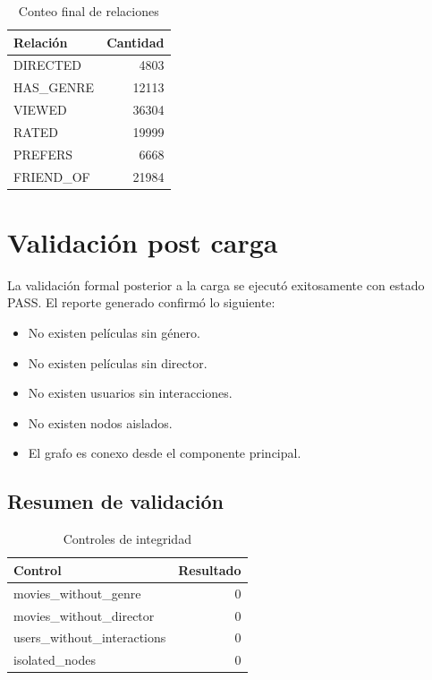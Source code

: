 \documentclass[12pt,a4paper]{article}
\begin{document}
\begin{table}[H]
\centering
\begin{tabular}{lr}
\toprule
\textbf{Relación} & \textbf{Cantidad} \\
\midrule
DIRECTED & 4803 \\
HAS\_GENRE & 12113 \\
VIEWED & 36304 \\
RATED & 19999 \\
PREFERS & 6668 \\
FRIEND\_OF & 21984 \\
\bottomrule
\end{tabular}
\caption{Conteo final de relaciones}
\end{table}

\section{Validación post carga}

La validación formal posterior a la carga se ejecutó exitosamente con estado PASS. El reporte generado confirmó lo siguiente:

\begin{itemize}
    \item No existen películas sin género.
    \item No existen películas sin director.
    \item No existen usuarios sin interacciones.
    \item No existen nodos aislados.
    \item El grafo es conexo desde el componente principal.
\end{itemize}

\subsection{Resumen de validación}

\begin{table}[H]
\centering
\begin{tabular}{lr}
\toprule
\textbf{Control} & \textbf{Resultado} \\
\midrule
movies\_without\_genre & 0 \\
movies\_without\_director & 0 \\
users\_without\_interactions & 0 \\
isolated\_nodes & 0 \\
\bottomrule
\end{tabular}
\caption{Controles de integridad}
\end{table}
\end{document}
